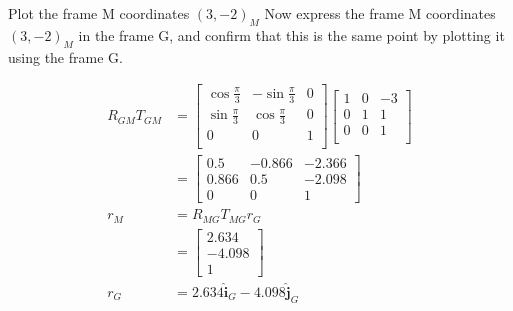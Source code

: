 Plot the frame M coordinates $(3, -2)_M$ Now express the frame M coordinates $(3, -2)_M$ in the frame G, and confirm that this is the same point by plotting it using the frame G.

\begin{solution}
\begin{align*}
    R_{GM}T_{GM} &= \begin{bmatrix}
        \cos{\frac{\pi}{3}} & -\sin{\frac{\pi}{3}} & 0 \\
        \sin{\frac{\pi}{3}} & \cos{\frac{\pi}{3}} & 0 \\
        0 & 0 & 1 \\
    \end{bmatrix} \begin{bmatrix}
        1 & 0 & -3 \\
        0 & 1 & 1 \\
        0 & 0 & 1 \\
    \end{bmatrix} \\
    &= \begin{bmatrix}
        0.5 & -0.866 & -2.366 \\
        0.866 & 0.5 & -2.098 \\
        0 & 0 & 1
    \end{bmatrix} \\
    r_M &= R_{MG} T_{MG} r_G \\
    &= \begin{bmatrix}
        2.634 \\
       -4.098 \\
        1
    \end{bmatrix} \\
    r_G &= 2.634 \boldsymbol{\hat{i}}_G - 4.098 \boldsymbol{\hat{j}}_G
\end{align*}

\begin{center}
\end{center}
\end{solution}